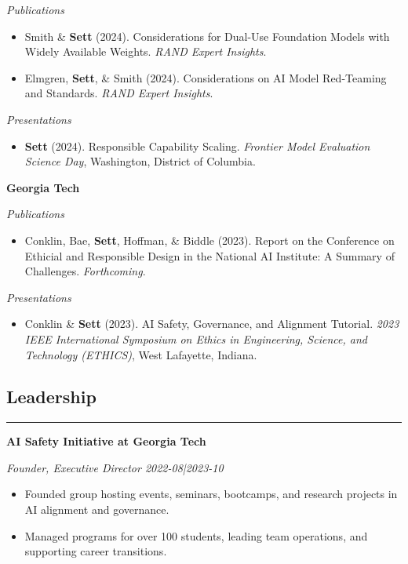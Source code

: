 \documentclass{article}
\newcommand{\headingOne}[1]{
    \subsection*{#1} \hrule
    \vspace*{6pt}
}
\newcommand{\headingTwo}[2]{
    \vspace*{6pt}
    \textbf{#1 \hfill #2}
}
\newcommand{\headingThree}[2]{
    \vspace*{2pt}
    \textsl{#1 \hfill #2}
}
\begin{document}
\headingThree{Publications}{}
\begin{itemize}
    \item Smith \& \textbf{Sett} (2024). Considerations for Dual-Use Foundation Models with Widely Available Weights. \textsl{RAND Expert Insights}.
    \item Elmgren, \textbf{Sett}, \& Smith (2024). Considerations on AI Model Red-Teaming and Standards. \textsl{RAND Expert Insights}.
\end{itemize}

\headingThree{Presentations}{}
\begin{itemize}
    \item \textbf{Sett} (2024). Responsible Capability Scaling. \textsl{Frontier Model Evaluation Science Day}, Washington, District of Columbia.
\end{itemize}

\headingTwo{Georgia Tech}{}

\headingThree{Publications}{}
\begin{itemize}
    \item Conklin, Bae, \textbf{Sett}, Hoffman, \& Biddle (2023). Report on the Conference on Ethicial and Responsible Design in the National AI Institute: A Summary of Challenges. \textsl{Forthcoming}.
\end{itemize}

\headingThree{Presentations}{}
\begin{itemize}
    \item Conklin \& \textbf{Sett} (2023). AI Safety, Governance, and Alignment Tutorial. \textsl{2023 IEEE International Symposium on Ethics in Engineering, Science, and Technology (ETHICS)}, West Lafayette, Indiana.
\end{itemize}


\headingOne{Leadership}


\headingTwo{AI Safety Initiative at Georgia Tech}{}

\headingThree{Founder, Executive Director}{2022-08|2023-10}
\begin{itemize}
    \item Founded group hosting events, seminars, bootcamps, and research projects in AI alignment and governance.
    \item Managed programs for over 100 students, leading team operations, and supporting career transitions.
\end{itemize}
\end{document}
